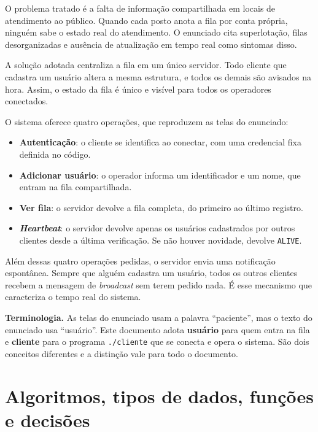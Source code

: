 \documentclass[12pt,a4paper]{article}
\begin{document}
O problema tratado é a falta de informação compartilhada em locais de
atendimento ao público. Quando cada posto anota a fila por conta própria,
ninguém sabe o estado real do atendimento. O enunciado cita superlotação, filas
desorganizadas e ausência de atualização em tempo real como sintomas disso.

A solução adotada centraliza a fila em um único servidor. Todo cliente que
cadastra um usuário altera a mesma estrutura, e todos os demais são avisados na
hora. Assim, o estado da fila é único e visível para todos os operadores
conectados.

O sistema oferece quatro operações, que reproduzem as telas do enunciado:

\begin{itemize}
  \item \textbf{Autenticação}: o cliente se identifica ao conectar, com uma
        credencial fixa definida no código.
  \item \textbf{Adicionar usuário}: o operador informa um identificador e um
        nome, que entram na fila compartilhada.
  \item \textbf{Ver fila}: o servidor devolve a fila completa, do primeiro ao
        último registro.
  \item \textbf{\textit{Heartbeat}}: o servidor devolve apenas os usuários
        cadastrados por outros clientes desde a última verificação. Se não
        houver novidade, devolve \texttt{ALIVE}.
\end{itemize}

Além dessas quatro operações pedidas, o servidor envia uma notificação
espontânea. Sempre que alguém cadastra um usuário, todos os outros clientes
recebem a mensagem de \textit{broadcast} sem terem pedido nada. É esse
mecanismo que caracteriza o tempo real do sistema.

\vspace{6pt}
\noindent\textbf{Terminologia.} As telas do enunciado usam a palavra
``paciente'', mas o texto do enunciado usa ``usuário''. Este documento adota
\textbf{usuário} para quem entra na fila e \textbf{cliente} para o programa
\texttt{./cliente} que se conecta e opera o sistema. São dois conceitos
diferentes e a distinção vale para todo o documento.

\section{Algoritmos, tipos de dados, funções e decisões}
\end{document}
